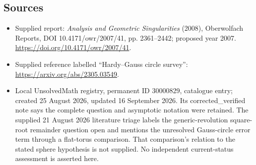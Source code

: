 \documentclass[11pt]{article}
\begin{document}
\subsection{Sources}
\begin{itemize}
\item Supplied report: \emph{Analysis and Geometric Singularities} (2008), Oberwolfach Reports, DOI 10.4171/owr/2007/41, pp. 2361--2442; proposed year 2007. \url{https://doi.org/10.4171/owr/2007/41}.
\item Supplied reference labelled ``Hardy--Gauss circle survey'': \url{https://arxiv.org/abs/2305.03549}.
\item Local UnsolvedMath registry, permanent ID 30000829, catalogue entry; created 25 August 2026, updated 16 September 2026. Its corrected\_verified note says the complete question and asymptotic notation were retained. The supplied 21 August 2026 literature triage labels the generic-revolution square-root remainder question open and mentions the unresolved Gauss-circle error term through a flat-torus comparison. That comparison's relation to the stated sphere hypothesis is not supplied. No independent current-status assessment is asserted here.
\end{itemize}
\end{document}
